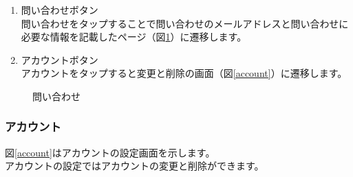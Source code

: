 \documentclass[a4j]{jarticle}
\begin{document}
\begin{enumerate}
  \renewcommand{\labelenumi}{\textcircled{\scriptsize \theenumi}}
\item 問い合わせボタン\\
  問い合わせをタップすることで問い合わせのメールアドレスと問い合わせに必要な情報を記載したページ（図\ref{inquiry}）に遷移します。
\item アカウントボタン\\
  アカウントをタップすると変更と削除の画面（図\ref{account}）に遷移します。
\end{enumerate}

\begin{figure}[H]
    \begin{center}
    \caption {問い合わせ}
    \label{inquiry}
    \end{center}
\end{figure}

\newpage
\subsubsection{アカウント}
図\ref{account}はアカウントの設定画面を示します。\\
アカウントの設定ではアカウントの変更と削除ができます。
\end{document}

